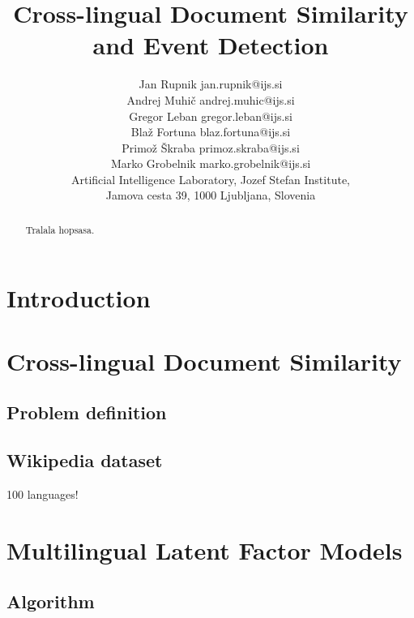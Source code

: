 \documentclass[twoside,11pt]{article}
\begin{document}
\title{Cross-lingual Document Similarity and Event Detection}

\author{\name Jan Rupnik \email jan.rupnik@ijs.si \\
       \name Andrej Muhi\v{c} \email andrej.muhic@ijs.si \\
       \name Gregor Leban \email gregor.leban@ijs.si \\
       \name Bla\v{z} Fortuna \email blaz.fortuna@ijs.si \\
       \name Primo\v{z} \v{S}kraba \email primoz.skraba@ijs.si \\
       \name Marko Grobelnik \email marko.grobelnik@ijs.si \\
       \addr Artificial Intelligence Laboratory, Jozef Stefan Institute,\\
       Jamova cesta 39, 1000 Ljubljana, Slovenia}

\maketitle

\begin{abstract}
Tralala hopsasa.
\end{abstract}

\section{Introduction}
\label{Introduction}


\section{Cross-lingual Document Similarity}

\subsection{Problem definition}

\subsection{Wikipedia dataset}

100 languages!


\section{Multilingual Latent Factor Models}

\subsection{Algorithm}
\end{document}
